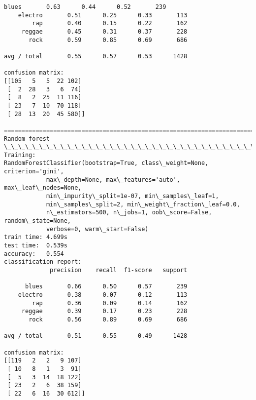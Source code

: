 \documentclass[11pt]{article}
\begin{document}
\begin{Verbatim}[commandchars=\\\{\}]
      blues       0.63      0.44      0.52       239
    electro       0.51      0.25      0.33       113
        rap       0.40      0.15      0.22       162
     reggae       0.45      0.31      0.37       228
       rock       0.59      0.85      0.69       686

avg / total       0.55      0.57      0.53      1428

confusion matrix:
[[105   5   5  22 102]
 [  2  28   3   6  74]
 [  8   2  25  11 116]
 [ 23   7  10  70 118]
 [ 28  13  20  45 580]]

================================================================================
Random forest
\_\_\_\_\_\_\_\_\_\_\_\_\_\_\_\_\_\_\_\_\_\_\_\_\_\_\_\_\_\_\_\_\_\_\_\_\_\_\_\_\_\_\_\_\_\_\_\_\_\_\_\_\_\_\_\_\_\_\_\_\_\_\_\_\_\_\_\_\_\_\_\_\_\_\_\_\_\_\_\_
Training: 
RandomForestClassifier(bootstrap=True, class\_weight=None, criterion='gini',
            max\_depth=None, max\_features='auto', max\_leaf\_nodes=None,
            min\_impurity\_split=1e-07, min\_samples\_leaf=1,
            min\_samples\_split=2, min\_weight\_fraction\_leaf=0.0,
            n\_estimators=500, n\_jobs=1, oob\_score=False, random\_state=None,
            verbose=0, warm\_start=False)
train time: 4.699s
test time:  0.539s
accuracy:   0.554
classification report:
             precision    recall  f1-score   support

      blues       0.66      0.50      0.57       239
    electro       0.38      0.07      0.12       113
        rap       0.36      0.09      0.14       162
     reggae       0.39      0.17      0.23       228
       rock       0.56      0.89      0.69       686

avg / total       0.51      0.55      0.49      1428

confusion matrix:
[[119   2   2   9 107]
 [ 10   8   1   3  91]
 [  5   3  14  18 122]
 [ 23   2   6  38 159]
 [ 22   6  16  30 612]]


    \end{Verbatim}
\end{document}

